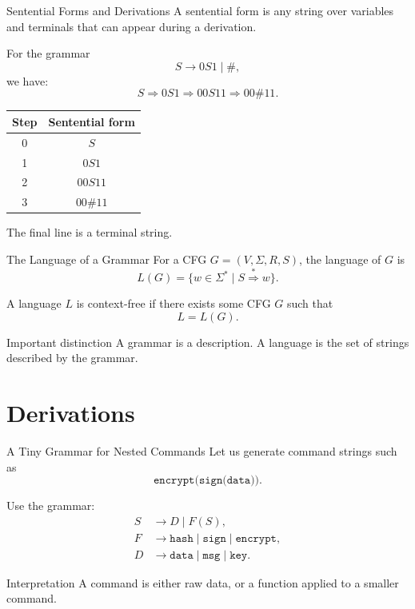\documentclass[aspectratio=169,10pt]{beamer}
\newcommand{\der}{\Rightarrow}
\newcommand{\ders}{\overset{*}{\Rightarrow}}
\newcommand{\code}[1]{\texttt{#1}}
\begin{document}
\begin{frame}{Sentential Forms and Derivations}
\small
A \alert{sentential form} is any string over variables and terminals that can appear during a derivation.

\vspace{0.7em}
For the grammar
\[
S\to 0S1\mid\#,
\]
we have:
\[
S\der 0S1\der 00S11\der 00\#11.
\]

\begin{center}
\renewcommand{\arraystretch}{1.25}
\begin{tabular}{c|c}
Step & Sentential form\\
\hline
0 & \(S\)\\
1 & \(0S1\)\\
2 & \(00S11\)\\
3 & \(00\#11\)\\
\end{tabular}
\end{center}

The final line is a terminal string.
\end{frame}

\begin{frame}{The Language of a Grammar}
\small
For a CFG \(G=(V,\Sigma,R,S)\), the language of \(G\) is
\[
L(G)=\{w\in\Sigma^*\mid S\ders w\}.
\]

\vspace{0.5em}
A language \(L\) is \alert{context-free} if there exists some CFG \(G\) such that
\[
L=L(G).
\]

\begin{exampleblock}{Important distinction}
A grammar is a description. A language is the set of strings described by the grammar.
\end{exampleblock}
\end{frame}

\section{Derivations}

\begin{frame}{A Tiny Grammar for Nested Commands}
\small
Let us generate command strings such as
\[
\code{encrypt(sign(data))}.
\]

Use the grammar:
\[
\begin{aligned}
S&\to D\mid F(S),\\
F&\to \code{hash}\mid \code{sign}\mid \code{encrypt},\\
D&\to \code{data}\mid \code{msg}\mid \code{key}.
\end{aligned}
\]

\begin{block}{Interpretation}
A command is either raw data, or a function applied to a smaller command.
\end{block}
\end{frame}
\end{document}
